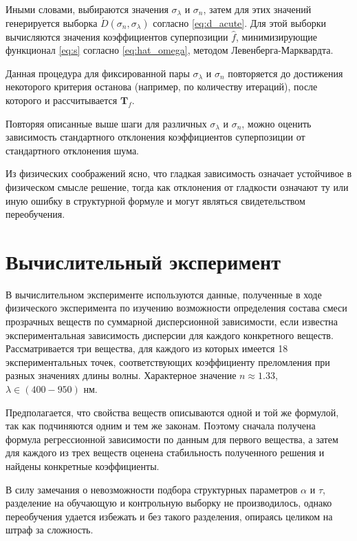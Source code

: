 \documentclass[12pt,a4paper]{article}
\begin{document}
Иными словами, выбираются значения $\sigma_{\lambda}$ и $\sigma_n$, затем для этих
значений генерируется выборка $\acute{D}(\sigma_n, \sigma_{\lambda})$ согласно
\eqref{eq:d_acute}. Для этой выборки вычисляются значения коэффициентов суперпозиции
$\hat{f}$, минимизирующие функционал \eqref{eq:s} согласно \eqref{eq:hat_omega},
методом Левенберга-Марквардта.

Данная процедура для фиксированной пары $\sigma_{\lambda}$ и $\sigma_n$ повторяется
до достижения некоторого критерия останова (например, по количеству итераций),
после которого и рассчитывается $\mathbf{T}_f$.

Повторяя описанные выше шаги для различных $\sigma_{\lambda}$ и $\sigma_n$, можно
оценить зависимость стандартного отклонения коэффициентов суперпозиции от
стандартного отклонения шума.

Из физических соображений ясно, что гладкая зависимость означает устойчивое в
физическом смысле решение, тогда как отклонения от гладкости означают
ту или иную ошибку в структурной формуле и могут являться свидетельством переобучения.

\section{Вычислительный эксперимент}

В вычислительном эксперименте используются данные, полученные в ходе физического
эксперимента по изучению возможности определения состава смеси прозрачных
веществ по суммарной дисперсионной зависимости, если известна экспериментальная
зависимость дисперсии для каждого конкретного веществ. Рассматривается три
вещества, для каждого из которых имеется 18 экспериментальных точек,
соответствующих коэффициенту преломления при разных значениях длины волны.
Характерное значение $n \approx 1.33$, $\lambda \in (400-950)$ нм.

Предполагается, что свойства веществ описываются одной и той же формулой, так
как подчиняются одним и тем же законам. Поэтому сначала получена формула
регрессионной зависимости по данным для первого вещества, а затем для каждого
из трех веществ оценена стабильность полученного решения и найдены конкретные
коэффициенты.

В силу замечания о невозможности подбора структурных параметров $\alpha$ и $\tau$,
разделение на обучающую и контрольную выборку не производилось, однако переобучения
удается избежать и без такого разделения, опираясь целиком на штраф за сложность.
\end{document}
